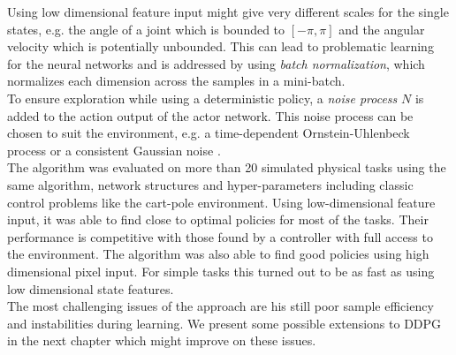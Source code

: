 Using low dimensional feature input might give very different scales for the single states, e.g. the angle of a joint which is bounded to $[-\pi, \pi]$ and the angular velocity which is potentially unbounded. This can lead to problematic learning for the neural networks and is addressed by using \textit{batch normalization}, which normalizes each dimension across the samples in a mini-batch.\\
To ensure exploration while using a deterministic policy, a \textit{noise process} $\mathit{N}$ is added to the action output of the actor network. This noise process can be chosen to suit the environment, e.g. a time-dependent Ornstein-Uhlenbeck process \citep{ricciardi1979ornstein} or a consistent Gaussian noise \citep{barth2018distributed}.\\
The algorithm was evaluated on more than 20 simulated physical tasks using the same algorithm, network structures and hyper-parameters including classic control problems like the cart-pole environment. Using low-dimensional feature input, it was able to find close to optimal policies for most of the tasks. Their performance is competitive with those found by a controller with full access to the environment. The algorithm was also able to find good policies using high dimensional pixel input. For simple tasks this turned out to be as fast as using low dimensional state features.\\
The most challenging issues of the approach are his still poor sample efficiency and instabilities during learning. We present some possible extensions to DDPG in the next chapter which might improve on these issues.
